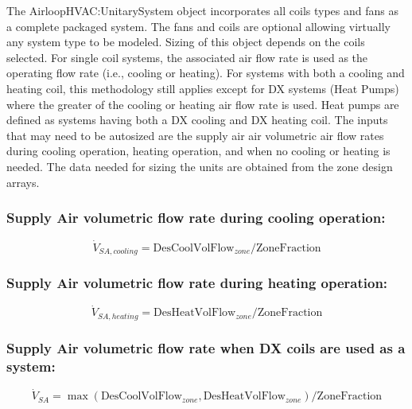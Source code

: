 The AirloopHVAC:UnitarySystem object incorporates all coils types and fans as a complete packaged system. The fans and coils are optional allowing virtually any system type to be modeled. Sizing of this object depends on the coils selected. For single coil systems, the associated air flow rate is used as the operating flow rate (i.e., cooling or heating). For systems with both a cooling and heating coil, this methodology still applies except for DX systems (Heat Pumps) where the greater of the cooling or heating air flow rate is used. Heat pumps are defined as systems having both a DX cooling and DX heating coil. The inputs that may need to be autosized are the supply air air volumetric air flow rates during cooling operation, heating operation, and when no cooling or heating is needed. The data needed for sizing the units are obtained from the zone design arrays.

\subsubsection{Supply Air volumetric flow rate during cooling operation:}\label{supply-air-volumetric-flow-rate-during-cooling-operation-1}

\begin{equation}
\dot V_{SA,cooling} = \text{DesCoolVolFlow}_{zone} / \text{ZoneFraction}
\end{equation}

\subsubsection{Supply Air volumetric flow rate during heating operation:}\label{supply-air-volumetric-flow-rate-during-heating-operation-1}

\begin{equation}
\dot V_{SA,heating} = \text{DesHeatVolFlow}_{zone} / \text{ZoneFraction}
\end{equation}

\subsubsection{Supply Air volumetric flow rate when DX coils are used as a system:}\label{supply-air-volumetric-flow-rate-when-dx-coils-are-used-as-a-system}

\begin{equation}
\dot V_{SA} = \max \left(\text{DesCoolVolFlow}_{zone}, \text{DesHeatVolFlow}_{zone}\right) / \text{ZoneFraction}
\end{equation}

